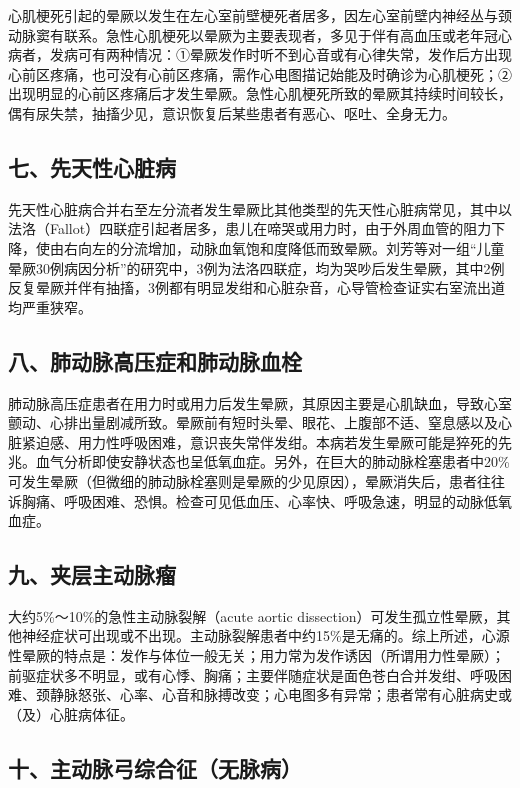心肌梗死引起的晕厥以发生在左心室前壁梗死者居多，因左心室前壁内神经丛与颈动脉窦有联系。急性心肌梗死以晕厥为主要表现者，多见于伴有高血压或老年冠心病者，发病可有两种情况：①晕厥发作时听不到心音或有心律失常，发作后方出现心前区疼痛，也可没有心前区疼痛，需作心电图描记始能及时确诊为心肌梗死；②出现明显的心前区疼痛后才发生晕厥。急性心肌梗死所致的晕厥其持续时间较长，偶有尿失禁，抽搐少见，意识恢复后某些患者有恶心、呕吐、全身无力。

\subsection{七、先天性心脏病}

先天性心脏病合并右至左分流者发生晕厥比其他类型的先天性心脏病常见，其中以法洛（Fallot）四联症引起者居多，患儿在啼哭或用力时，由于外周血管的阻力下降，使由右向左的分流增加，动脉血氧饱和度降低而致晕厥。刘芳等对一组“儿童晕厥30例病因分析”的研究中，3例为法洛四联症，均为哭吵后发生晕厥，其中2例反复晕厥并伴有抽搐，3例都有明显发绀和心脏杂音，心导管检查证实右室流出道均严重狭窄。

\subsection{八、肺动脉高压症和肺动脉血栓}

肺动脉高压症患者在用力时或用力后发生晕厥，其原因主要是心肌缺血，导致心室颤动、心排出量剧减所致。晕厥前有短时头晕、眼花、上腹部不适、窒息感以及心脏紧迫感、用力性呼吸困难，意识丧失常伴发绀。本病若发生晕厥可能是猝死的先兆。血气分析即使安静状态也呈低氧血症。另外，在巨大的肺动脉栓塞患者中20\%可发生晕厥（但微细的肺动脉栓塞则是晕厥的少见原因），晕厥消失后，患者往往诉胸痛、呼吸困难、恐惧。检查可见低血压、心率快、呼吸急速，明显的动脉低氧血症。

\subsection{九、夹层主动脉瘤}

大约5\%～10\%的急性主动脉裂解（acute aortic
dissection）可发生孤立性晕厥，其他神经症状可出现或不出现。主动脉裂解患者中约15\%是无痛的。综上所述，心源性晕厥的特点是：发作与体位一般无关；用力常为发作诱因（所谓用力性晕厥）；前驱症状多不明显，或有心悸、胸痛；主要伴随症状是面色苍白合并发绀、呼吸困难、颈静脉怒张、心率、心音和脉搏改变；心电图多有异常；患者常有心脏病史或（及）心脏病体征。

\subsection{十、主动脉弓综合征（无脉病）}

